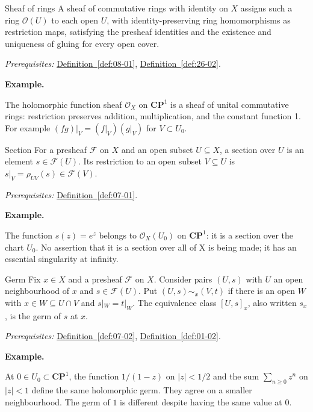 \documentclass[11pt]{article}
\makeatletter
\newcounter{definition}
\newcommand{\CP}{\mathbf{CP}}
\newcommand{\exampleheading}{\par\medskip\textbf{Example.}\par\smallskip}
\newcommand{\currentdefinition}[1]{\protected@edef\@currentlabel{#1}}
\makeatother
\begin{document}
\begin{definitionbox}{Sheaf of rings}
\currentdefinition{\thedefinition}
\label{def:26-03}
A sheaf of commutative rings with identity on $X$ assigns such a ring $\mathcal O(U)$ to each open $U$, with identity-preserving ring homomorphisms as restriction maps, satisfying the presheaf identities and the existence and uniqueness of gluing for every open cover.

\smallskip
\textit{Prerequisites:} \hyperref[def:08-01]{Definition~\ref*{def:08-01}}, \hyperref[def:26-02]{Definition~\ref*{def:26-02}}.

\exampleheading
The holomorphic function sheaf $\mathcal O_X$ on $\CP^1$ is a sheaf of unital commutative rings: restriction preserves addition, multiplication, and the constant function 1. For example $(fg)|_V=(f|_V)(g|_V)$ for $V\subset U_0$.
\end{definitionbox}

\begin{definitionbox}{Section}
\currentdefinition{\thedefinition}
\label{def:07-02}
For a presheaf $\mathcal F$ on $X$ and an open subset $U\subseteq X$, a section over $U$ is an element $s\in\mathcal F(U)$. Its restriction to an open subset $V\subseteq U$ is $s|_V=\rho_{UV}(s)\in\mathcal F(V)$.

\smallskip
\textit{Prerequisites:} \hyperref[def:07-01]{Definition~\ref*{def:07-01}}.

\exampleheading
The function $s(z)=e^z$ belongs to $\mathcal O_X(U_0)$ on $\CP^1$: it is a section over the chart $U_0$. No assertion that it is a section over all of X is being made; it has an essential singularity at infinity.
\end{definitionbox}

\begin{definitionbox}{Germ}
\currentdefinition{\thedefinition}
\label{def:09-01}
Fix $x\in X$ and a presheaf $\mathcal F$ on $X$. Consider pairs $(U,s)$ with $U$ an open neighbourhood of $x$ and $s\in\mathcal F(U)$. Put $(U,s)\sim_x(V,t)$ if there is an open $W$ with $x\in W\subseteq U\cap V$ and $s|_W=t|_W$. The equivalence class $[U,s]_x$, also written $s_x$, is the germ of $s$ at $x$.

\smallskip
\textit{Prerequisites:} \hyperref[def:07-02]{Definition~\ref*{def:07-02}}, \hyperref[def:01-02]{Definition~\ref*{def:01-02}}.

\exampleheading
At $0\in U_0\subset\CP^1$, the function $1/(1-z)$ on $|z|<1/2$ and the sum $\sum_{n\ge0}z^n$ on $|z|<1$ define the same holomorphic germ. They agree on a smaller neighbourhood. The germ of $1$ is different despite having the same value at 0.
\end{definitionbox}
\end{document}

